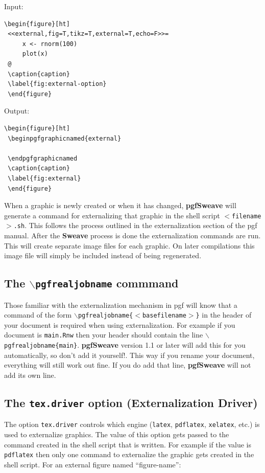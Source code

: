 \documentclass{article}
\newcommand{\code}{\texttt}
\newcommand{\pkg}{\textbf}
\begin{document}
\begin{minipage}[!ht]{.55\linewidth}
Input:
\begin{Verbatim}[frame=single]
 \begin{figure}[ht]
 <<external,fig=T,tikz=T,external=T,echo=F>>=
     x <- rnorm(100)
     plot(x)
 @  
 \caption{caption}
 \label{fig:external-option}
 \end{figure}
\end{Verbatim}
\end{minipage}
\begin{minipage}[!ht]{.45\linewidth}
Output:
\begin{Verbatim}[frame=single]
 \begin{figure}[ht]
 \beginpgfgraphicnamed{external}
 
 \endpgfgraphicnamed
 \caption{caption}
 \label{fig:external}
 \end{figure}
\end{Verbatim}
\end{minipage}

 When a graphic is newly created or when it has changed, \pkg{pgfSweave} will generate a command for externalizing that graphic in the shell script \code{$<$filename$>$.sh}.  This follows the process outlined in the externalization section of the pgf manual.  After the \pkg{Sweave} process is done the externalization commands are run.  This will create separate image files for each graphic. On later compilations this image file will simply be included instead of being regenerated.  
 

\subsection{The \code{$\backslash$pgfrealjobname} commmand}

Those familiar with the externalization mechanism in pgf will know that a command of the form \code{$\backslash$pgfrealjobname\{$<$basefilename$>$\}} in the header of your document is required when using externalization.   For example if you document is \code{main.Rnw} then your header should contain the line \code{$\backslash$pgfrealjobname\{main\}}. \pkg{pgfSweave} version 1.1 or later will add this for you automatically, so {\color{red} don't add it yourself!}.  This way if you rename your document, everything will still work out fine.  If you do add that line, \pkg{pgfSweave} will not add its own line.  
 
\subsection{The \code{tex.driver} option (Externalization Driver)}
The option \code{tex.driver} controls which engine (\code{latex}, \code{pdflatex}, \code{xelatex}, etc.) is used to externalize graphics.  The value of this option gets passed to the command created in the shell script that is written. For example if the value is \code{pdflatex} then only one command to externalize the graphic gets created in the shell script. For an external figure named ``figure-name'':
\end{document}
